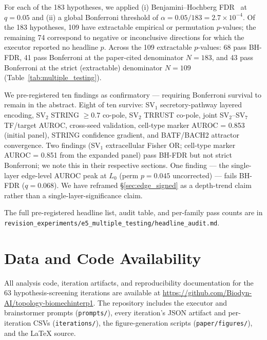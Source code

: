 \documentclass[12pt]{article}
\begin{document}
For each of the 183 hypotheses, we applied (i) Benjamini--Hochberg FDR~\cite{benjamini1995controlling} at $q = 0.05$ and (ii) a global Bonferroni threshold of $\alpha = 0.05/183 = 2.7 \times 10^{-4}$.
Of the 183 hypotheses, 109 have extractable empirical or permutation $p$-values; the remaining 74 correspond to negative or inconclusive directions for which the executor reported no headline $p$.
Across the 109 extractable $p$-values: 68 pass BH-FDR, 41 pass Bonferroni at the paper-cited denominator $N = 183$, and 43 pass Bonferroni at the strict (extractable) denominator $N = 109$ (Table~\ref{tab:multiple_testing}).

We pre-registered ten findings as confirmatory --- requiring Bonferroni survival to remain in the abstract.
Eight of ten survive: SV$_1$ secretory-pathway layered encoding, SV$_2$ STRING $\geq 0.7$ co-pole, SV$_2$ TRRUST co-pole, joint SV$_2$--SV$_7$ TF/target AUROC, cross-seed validation, cell-type marker AUROC = 0.853 (initial panel), STRING confidence gradient, and BATF/BACH2 attractor convergence.
Two findings (SV$_1$ extracellular Fisher OR; cell-type marker AUROC = 0.851 from the expanded panel) pass BH-FDR but not strict Bonferroni; we note this in their respective sections.
One finding --- the single-layer edge-level AUROC peak at $L_0$ (perm $p = 0.045$ uncorrected) --- fails BH-FDR ($q = 0.068$).
We have reframed §\ref{sec:edge_signed} as a depth-trend claim rather than a single-layer-significance claim.

The full pre-registered headline list, audit table, and per-family pass counts are in \texttt{revision\_experiments/e5\_multiple\_testing/headline\_audit.md}.

\section*{Data and Code Availability}
All analysis code, iteration artifacts, and reproducibility documentation for the 63 hypothesis-screening iterations are available at \url{https://github.com/Biodyn-AI/topology-biomechinterp1}. The repository includes the executor and brainstormer prompts (\texttt{prompts/}), every iteration's JSON artifact and per-iteration CSVs (\texttt{iterations/}), the figure-generation scripts (\texttt{paper/figures/}), and the LaTeX source.
\end{document}

